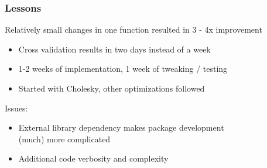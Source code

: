 \documentclass[t]{beamer}\usepackage[]{graphicx}\usepackage[]{color}
\begin{document}

\begin{frame}
\frametitle{Lessons}

Relatively small changes in one function resulted in 3 - 4x improvement

\begin{itemize}
\vspace{2mm} \item Cross validation results in two days instead of a week

\vspace{2mm} \item 1-2 weeks of implementation, 1 week of tweaking / testing

\vspace{2mm} \item Started with Cholesky, other optimizations followed
\end{itemize}

\vspace{7mm} \pause

Issues:

\begin{itemize}
\vspace{2mm} \item External library dependency makes package development \\ (much) more complicated

\vspace{2mm} \item Additional code verbosity and complexity

\end{itemize}

\end{frame}

\end{document}
